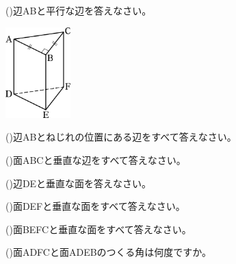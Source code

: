\documentclass[
  12pt,a4paper,lualatex,ja=standard]{bxjsarticle}
\begin{document}
\begin{flushleft}
\begin{multicols}{2}
()\hspace{2.5pt}辺ABと平行な辺を答えなさい。

\vspace{3mm}\null

\columnbreak

\begin{center}
\def\@captype{figure}
\includegraphics[height=35mm]{img/img1.jpg}

\end{center}

\end{multicols}

()\hspace{2.5pt}辺ABとねじれの位置にある辺をすべて答えなさい。

\vspace{10mm}

()\hspace{2.5pt}面ABCと垂直な辺をすべて答えなさい。

\vspace{10mm}

()\hspace{2.5pt}辺DEと垂直な面を答えなさい。

\vspace{10mm}

()\hspace{2.5pt}面DEFと垂直な面をすべて答えなさい。

\vspace{10mm}

()\hspace{2.5pt}面BEFCと垂直な面をすべて答えなさい。

\vspace{10mm}

()\hspace{2.5pt}面ADFCと面ADEBのつくる角は何度ですか。


\end{flushleft}
\end{document}
